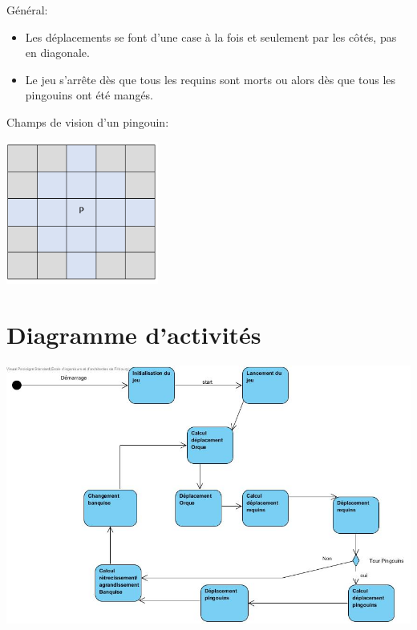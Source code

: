 \documentclass[12pt]{article}
\begin{document}
\newpage
	Général:
	\begin{itemize}
		\item Les déplacements se font d'une case à la fois et seulement par les côtés, pas en diagonale.
		\item Le jeu s'arrête dès que tous les requins sont morts ou alors dès que tous les pingouins ont été mangés.
	\end{itemize}
	\medskip
	Champs de vision d'un pingouin: \\
	\begin{center}
		\includegraphics[width=5cm]{schema_Pingouin.png}\\[0.3cm]
	\end{center}
\section{Diagramme d'activités}

			\includegraphics[width=15cm]{WaterWorld.jpg}\\[0.3cm]
\end{document}
